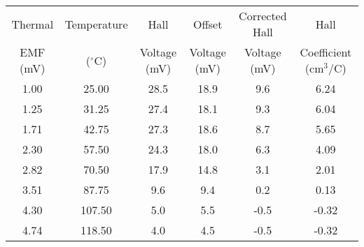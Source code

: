 \begin{table*}[]
    \centering
    \begin{tabular}{|c|c|c|c|c|c|}
    \hline
    Thermal  & Temperature & Hall & Offset & Corrected Hall & Hall \\ 
    EMF (mV) & ($^\circ$C) & Voltage (mV) & Voltage (mV) & Voltage (mV) & Coefficient (cm$^3$/C) \\ \hline
    1.00 & 25.00 & 28.5 & 18.9 & 9.6 & 6.24 \\ \hline
    1.25 & 31.25 & 27.4 & 18.1 & 9.3 & 6.04 \\ \hline
    1.71 & 42.75 & 27.3 & 18.6 & 8.7 & 5.65 \\ \hline
    2.30 & 57.50 & 24.3 & 18.0 & 6.3 & 4.09 \\ \hline
    2.82 & 70.50 & 17.9 & 14.8 & 3.1 & 2.01 \\ \hline
    3.51 & 87.75 & 9.6 & 9.4 & 0.2 & 0.13 \\ \hline
    4.30 & 107.50 & 5.0 & 5.5 & -0.5 & -0.32 \\ \hline
    4.74 & 118.50 & 4.0 & 4.5 & -0.5 & -0.32 \\ \hline
    \end{tabular}
    \caption{}
    \label{tab:tem}
    \end{table*}